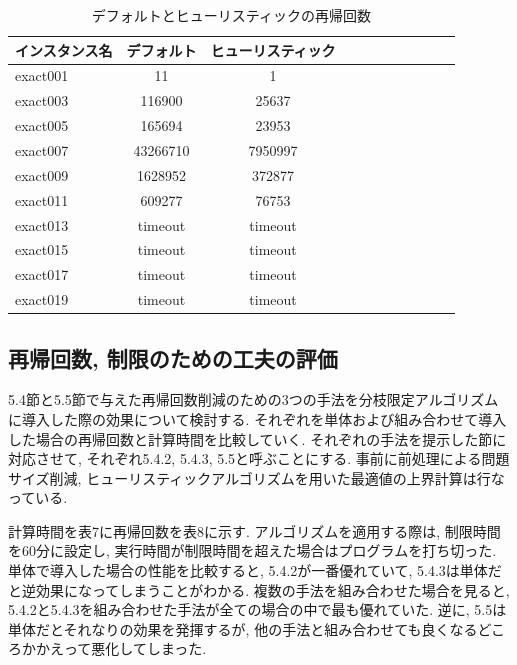 \documentclass[10.5,a4paper,titlepage, dvipdfmx]{bxjsarticle}
\begin{document}
\begin{table}[H]
    \caption{デフォルトとヒューリスティックの再帰回数}
    \label{table:data_type}
    \centering
    \begin{tabular}{l|cccccccccr}
        \hline
        インスタンス名  & デフォルト  &  ヒューリスティック\\
        \hline
        exact001  & 11  & 1\\
        exact003 & 116900 & 25637\\
        exact005 & 165694 & 23953\\
        exact007 & 43266710 & 7950997\\
        exact009 & 1628952 & 372877\\
        exact011 & 609277 & 76753\\
        exact013 & timeout & timeout\\
        exact015 & timeout & timeout\\
        exact017 & timeout & timeout\\
        exact019 & timeout & timeout\\
        \hline
    \end{tabular}
\end{table}


\subsection{再帰回数, 制限のための工夫の評価}
5.4節と5.5節で与えた再帰回数削減のための3つの手法を分枝限定アルゴリズムに導入した際の効果について検討する.
それぞれを単体および組み合わせて導入した場合の再帰回数と計算時間を比較していく.
それぞれの手法を提示した節に対応させて, それぞれ5.4.2, 5.4.3, 5.5と呼ぶことにする.
事前に前処理による問題サイズ削減, ヒューリスティックアルゴリズムを用いた最適値の上界計算は行なっている.\par
計算時間を表7に再帰回数を表8に示す.
アルゴリズムを適用する際は, 制限時間を60分に設定し, 実行時間が制限時間を超えた場合はプログラムを打ち切った.
単体で導入した場合の性能を比較すると, 5.4.2が一番優れていて, 5.4.3は単体だと逆効果になってしまうことがわかる.
複数の手法を組み合わせた場合を見ると, 5.4.2と5.4.3を組み合わせた手法が全ての場合の中で最も優れていた.
逆に, 5.5は単体だとそれなりの効果を発揮するが, 他の手法と組み合わせても良くなるどころかかえって悪化してしまった.
\end{document}
